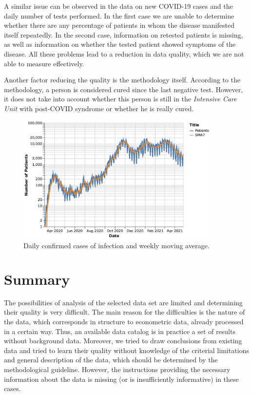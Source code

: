 A similar issue can be observed in the data on new COVID-19 cases and the daily number of tests performed.
In the first case we are unable to determine whether there are any percentage of patients in whom the disease manifested itself repeatedly.
In the second case, information on retested patients is missing, as well as information on whether the tested patient showed symptoms of the disease.
All these problems lead to a reduction in data quality, which we are not able to measure effectively.

Another factor reducing the quality is the methodology itself.
According to the methodology, a person is considered cured since the last negative test.
However, it does not take into account whether this person is still in the \textit{Intensive Care Unit} with post-COVID syndrome or whether he is really cured.

\begin{figure}[htb]
    \centering
    \includegraphics[width=0.9\textwidth]{figures/recovered-sma7.eps}
    \caption{Daily confirmed cases of infection and weekly moving average.}
    \label{fig:recovered-sma7}
\end{figure}
\FloatBarrier

\section{Summary}

The possibilities of analysis of the selected data set are limited and determining their quality is very difficult.
The main reason for the difficulties is the nature of the data, which corresponds in structure to econometric data, already processed in a certain way.
Thus, an available data catalog is in practice a set of results without background data.
Moreover, we tried to draw conclusions from existing data and tried to learn their quality without knowledge of the criterial limitations and general description of the data, which should be determined by the methodological guideline.
However, the instructions providing the necessary information about the data is missing (or is insufficiently informative) in these cases.
